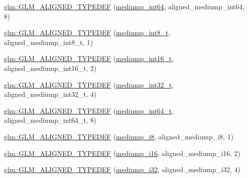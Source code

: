 \begin{DoxyCompactItemize}
\item 
\hyperlink{group__gtx__type__aligned_gad9e5babb1dd3e3531b42c37bf25dd951}{glm\+::\+G\+L\+M\+\_\+\+A\+L\+I\+G\+N\+E\+D\+\_\+\+T\+Y\+P\+E\+D\+EF} (\hyperlink{group__gtc__type__precision_ga603c695fe5cd677d3f72a81343e19a74}{mediump\+\_\+int64}, aligned\+\_\+mediump\+\_\+int64, 8)
\item 
\hyperlink{group__gtx__type__aligned_ga353fd9fa8a9ad952fcabd0d53ad9a6dd}{glm\+::\+G\+L\+M\+\_\+\+A\+L\+I\+G\+N\+E\+D\+\_\+\+T\+Y\+P\+E\+D\+EF} (\hyperlink{group__gtc__type__precision_ga626ac5f73d3538e62a879d6c56abfb36}{mediump\+\_\+int8\+\_\+t}, aligned\+\_\+mediump\+\_\+int8\+\_\+t, 1)
\item 
\hyperlink{group__gtx__type__aligned_ga2196442c0e5c5e8c77842de388c42521}{glm\+::\+G\+L\+M\+\_\+\+A\+L\+I\+G\+N\+E\+D\+\_\+\+T\+Y\+P\+E\+D\+EF} (\hyperlink{group__gtc__type__precision_ga478fab608cf43040013d719a3e03b194}{mediump\+\_\+int16\+\_\+t}, aligned\+\_\+mediump\+\_\+int16\+\_\+t, 2)
\item 
\hyperlink{group__gtx__type__aligned_ga1284488189daf897cf095c5eefad9744}{glm\+::\+G\+L\+M\+\_\+\+A\+L\+I\+G\+N\+E\+D\+\_\+\+T\+Y\+P\+E\+D\+EF} (\hyperlink{group__gtc__type__precision_gafd9b4bd9e4465aec63351b59100692c4}{mediump\+\_\+int32\+\_\+t}, aligned\+\_\+mediump\+\_\+int32\+\_\+t, 4)
\item 
\hyperlink{group__gtx__type__aligned_ga73fdc86a539808af58808b7c60a1c4d8}{glm\+::\+G\+L\+M\+\_\+\+A\+L\+I\+G\+N\+E\+D\+\_\+\+T\+Y\+P\+E\+D\+EF} (\hyperlink{group__gtc__type__precision_ga555a2f85641550c232db473a9bb981f7}{mediump\+\_\+int64\+\_\+t}, aligned\+\_\+mediump\+\_\+int64\+\_\+t, 8)
\item 
\hyperlink{group__gtx__type__aligned_gafafeea923e1983262c972e2b83922d3b}{glm\+::\+G\+L\+M\+\_\+\+A\+L\+I\+G\+N\+E\+D\+\_\+\+T\+Y\+P\+E\+D\+EF} (\hyperlink{group__gtc__type__precision_ga28a8b5fd51072680bb55178c17cc7411}{mediump\+\_\+i8}, aligned\+\_\+mediump\+\_\+i8, 1)
\item 
\hyperlink{group__gtx__type__aligned_ga4b35ca5fe8f55c9d2fe54fdb8d8896f4}{glm\+::\+G\+L\+M\+\_\+\+A\+L\+I\+G\+N\+E\+D\+\_\+\+T\+Y\+P\+E\+D\+EF} (\hyperlink{group__gtc__type__precision_ga8454fc6a82c7bb787d0ac9663e08f63d}{mediump\+\_\+i16}, aligned\+\_\+mediump\+\_\+i16, 2)
\item 
\hyperlink{group__gtx__type__aligned_ga63b882e29170d428463d99c3d630acc6}{glm\+::\+G\+L\+M\+\_\+\+A\+L\+I\+G\+N\+E\+D\+\_\+\+T\+Y\+P\+E\+D\+EF} (\hyperlink{group__gtc__type__precision_ga5e00ec824eb55968a6b6496f294d8c07}{mediump\+\_\+i32}, aligned\+\_\+mediump\+\_\+i32, 4)

\end{DoxyCompactItemize}
